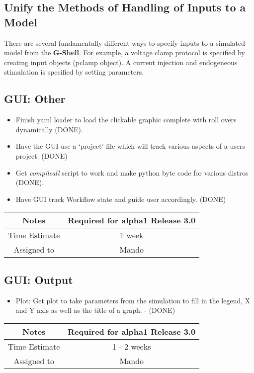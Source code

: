 \documentclass[12pt]{article}
\begin{document}
\subsection{Unify the Methods of Handling of Inputs to a Model}

There are several fundamentally different ways to specify inputs to a
simulated model from the {\bf G-Shell}.  For example, a voltage clamp
protocol is specified by creating input objects (pclamp object).  A
current injection and endogeneous stimulation is specified by setting
parameters.


\subsection{GUI: Other}
\begin{itemize}
\item Finish yaml loader to load the clickable graphic complete with
  roll overs dynamically (DONE).
\item Have the GUI use a `project' file which will track various
  aspects of a users project. (DONE)
\item Get {\it compileall} script to work and make python byte code for
  various distros (DONE).
\item Have GUI track Workflow state and guide user accordingly. (DONE)
\end{itemize}

{
  \vspace{5mm}
  \centering
  \begin{tabular}{|c|c|}
    \hline
    Notes
    & Required for alpha1 Release 3.0 \\
    \hline
    Time Estimate
    & 1 week \\
    \hline
    Assigned to
    & Mando \\
    \hline
  \end{tabular}
}


\subsection{GUI: Output}
\begin{itemize}
\item Plot: Get plot to take parameters from the simulation to fill in
  the legend, X and Y axis as well as the title of a graph. - (DONE)
\end{itemize}

{
  \vspace{5mm}
  \centering
  \begin{tabular}{|c|c|}
    \hline
    Notes
    & Required for alpha1 Release 3.0 \\
    \hline
    Time Estimate
    & 1 - 2 weeks \\
    \hline
    Assigned to
    & Mando \\
    \hline
  \end{tabular}
}
\end{document}
